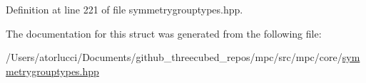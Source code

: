 Definition at line 221 of file symmetrygrouptypes.\+hpp.



The documentation for this struct was generated from the following file\+:\begin{DoxyCompactItemize}
\item 
/\+Users/atorlucci/\+Documents/github\+\_\+threecubed\+\_\+repos/mpc/src/mpc/core/\mbox{\hyperlink{symmetrygrouptypes_8hpp}{symmetrygrouptypes.\+hpp}}\end{DoxyCompactItemize}
